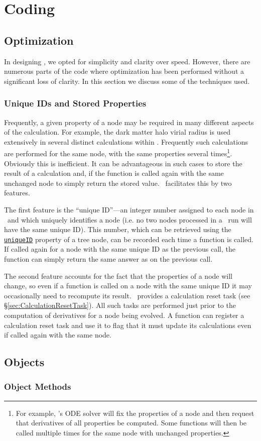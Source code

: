 \chapter{Coding \glc}

\section{Optimization}\label{sec:Optimization}

In designing \glc, we opted for simplicity and clarity over speed. However, there are numerous parts of the code where optimization has been performed without a significant loss of clarity. In this section we discuss some of the techniques used.

\subsection{Unique IDs and Stored Properties}

Frequently, a given property of a node may be required in many different aspects of the calculation. For example, the dark matter halo virial radius is used extensively in several distinct calculations within \glc. Frequently such calculations are performed for the same node, with the same properties several times\footnote{For example, \glc's ODE solver will fix the properties of a node and then request that derivatives of all properties be computed. Some functions will then be called multiple times for the same node with unchanged properties.}. Obviously this is inefficient. It can be advantageous in such cases to store the result of a calculation and, if the function is called again with the same unchanged node to simply return the stored value. \glc\ facilitates this by two features.

The first feature is the ``unique ID''---an integer number assigned to each node in \glc\ and which uniquely identifies a node (i.e. no two nodes processed in a \glc\ run will have the same unique ID). This number, which can be retrieved using the \href{method:uniqueID}{{\tt uniqueID}} property of a tree node, can be recorded each time a function is called. If called again for a node with the same unique ID as the previous call, the function can simply return the same answer as on the previous call.

The second feature accounts for the fact that the properties of a node will change, so even if a function is called on a node with the same unique ID it may occasionally need to recompute its result. \glc\ provides a calculation reset task (see \S\ref{sec:CalculationResetTask}). All such tasks are performed just prior to the computation of derivatives for a node being evolved. A function can register a calculation reset task and use it to flag that it must update its calculations even if called again with the same node.

\section{Objects}

\subsection{Object Methods}



